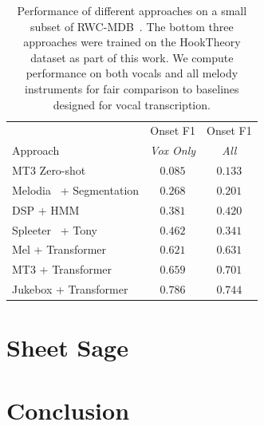 \documentclass{article}
\newcommand{\mel}{Mel}
\newcommand{\mtthree}{MT3}
\newcommand{\jukebox}{Jukebox}
\newcommand{\hooktheory}{HookTheory}
\newcommand{\rwc}{RWC-MDB}
\newcommand{\fone}{F1}
\begin{document}
\begin{table}[]
    \centering
    \begin{tabular}{lcc}
\toprule
 & Onset \fone{} & Onset \fone{} \\
Approach & \emph{Vox Only} & \emph{All} \\
\midrule
MT3 Zero-shot~\cite{gardner2021mt3} & $0.085$ & $0.133$ \\
Melodia~\cite{salamon2014melody} + Segmentation & $0.268$ & $0.201$ \\
DSP + HMM~\cite{ryynanen2006transcription,ryynanen2008automatic} & $0.381$ & $0.420$ \\
Spleeter~\cite{hennequin2020spleeter} + Tony~\cite{mauch2015computer} & $0.462$ & $0.341$ \\
\midrule
\mel{} + Transformer & $0.621$ & $0.631$ \\
\mtthree{} + Transformer & $0.659$ & $0.701$ \\
\jukebox{} + Transformer & $\mathbf{0.786}$ & $\mathbf{0.744}$ \\
\bottomrule
    \end{tabular}
    \caption{Performance of different approaches on a small subset of \rwc~\cite{goto2002rwc,goto2003rwc,goto2004development}. The bottom three approaches were trained on the \hooktheory{} dataset as part of this work. We compute performance on both vocals and all melody instruments for fair comparison to baselines designed for vocal transcription.}
    \label{tab:rwc_ryy}
\end{table}

\section{Sheet Sage}

\section{Conclusion}



\end{document}
